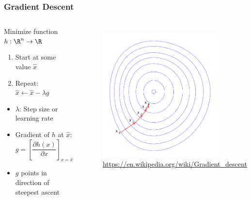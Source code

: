 \begin{frame}
	\frametitle{Gradient Descent}
	\begin{columns}[onlytextwidth]
		\begin{block}{Minimize function $h: \R^n \to \R$}
			\begin{enumerate}
				\item Start at some value $\hat x$
				\item Repeat: $\hat x \leftarrow \hat x - \lambda g$
			\end{enumerate}
			\begin{itemize}
				\item $\lambda$: Step size or learning rate
				\item Gradient of $h$ at $\hat x$:
				$$
				g = \left[\frac{\partial h(x)}{\partial x}\right]_{x = \hat x}
				$$ 
				\item $g$ points in direction of steepest ascent
			\end{itemize}
		\end{block}
		
		\begin{figure}
			\includegraphics[width=0.8\textwidth]{../figs/gradient_descent.png}
			\tiny\url{https://en.wikipedia.org/wiki/Gradient_descent}
		\end{figure}
	\end{columns}
\end{frame}


